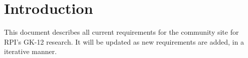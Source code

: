 \section{Introduction}

This document describes all current requirements for the community site for RPI's GK-12 research.
It will be updated as new requirements are added, in a iterative manner.
